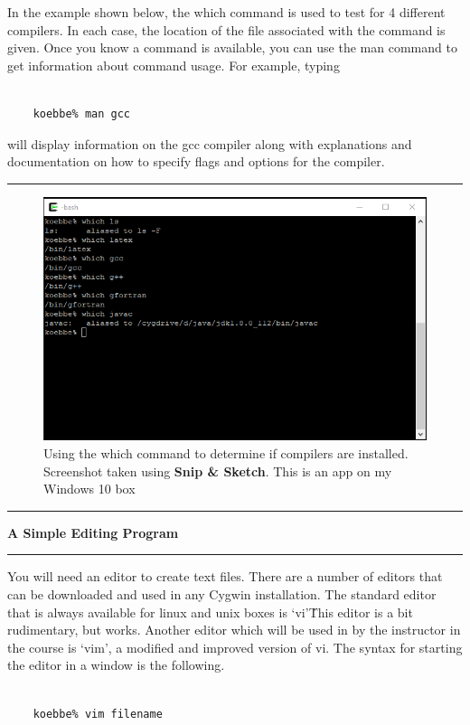 \documentclass[10pt,fleqn]{article}
\begin{document}
In the example shown below, the which command is used to test for 4 different
compilers. In each case, the location of the file associated with the command is
given. Once you know a command is available, you can use the man command to get
information about command usage. For example, typing
\begin{verbatim}

    koebbe% man gcc

\end{verbatim}
will display information on the gcc compiler along with explanations and
documentation on how to specify flags and options for the compiler.
\vskip0.1in\hrule\vskip0.1in
\vfill
\begin{figure}[h]
\centering
\includegraphics{../images/cygwin_04.png}
\caption{Using the which command to determine if compilers are installed.
         Screenshot taken using {\bf Snip \& Sketch}. This is an app on my
         Windows 10 box}
\end{figure}
\eject
\vskip0.1in\hrule\vskip0.1in
\noindent
{\large{\bf A Simple Editing Program}} 
\vskip0.1in\hrule\vskip0.1in
\noindent
You will need an editor to create text files. There are a number of editors that
can be downloaded and used in any Cygwin installation. The standard editor that
is always available for linux and unix boxes is \lq vi\rq\. This editor is a bit
rudimentary, but works. Another editor which will be used in by the instructor
in the course is \lq vim\rq, a modified and improved version of vi. The syntax
for starting the editor in a window is the following.
\begin{verbatim}

    koebbe% vim filename

\end{verbatim}
\end{document}
